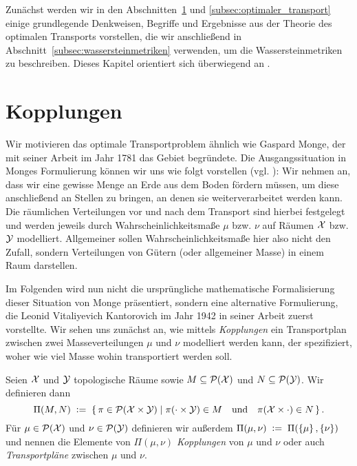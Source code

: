 \documentclass[../thesis/thesis.tex]{subfiles}
\begin{document}
	Zunächst werden wir in den Abschnitten~\ref{subsec:kopplungen} und \ref{subsec:optimaler_transport} einige grundlegende Denkweisen, Begriffe und Ergebnisse aus der Theorie des optimalen Transports vorstellen,
	die wir anschließend in Abschnitt~\ref{subsec:wassersteinmetriken} verwenden, um die Wassersteinmetriken zu beschreiben. Dieses Kapitel orientiert sich überwiegend an \cite[Chapter 4--6]{Villani.2009}.
	
	\section{Kopplungen}
	\label{subsec:kopplungen}
	
	Wir motivieren das optimale Transportproblem ähnlich wie Gaspard Monge, der mit seiner Arbeit \cite{Monge.1781} im Jahr 1781 das Gebiet begründete.  
	Die Ausgangssituation in Monges Formulierung können wir uns wie folgt vorstellen (vgl. \cite[S. 29--30]{Villani.2009}):
	Wir nehmen an, dass wir eine gewisse Menge an Erde aus dem Boden fördern müssen, um diese anschließend an Stellen zu bringen, an denen sie weiterverarbeitet werden kann. Die räumlichen Verteilungen vor und
	nach dem Transport sind hierbei festgelegt und werden jeweils durch Wahrscheinlichkeitsmaße $\mu$ bzw. $\nu$ auf Räumen $\mathcal{X}$ bzw. $\mathcal{Y}$ modelliert. 
	Allgemeiner sollen Wahrscheinlichkeitsmaße hier also nicht den Zufall, sondern Verteilungen von Gütern (oder allgemeiner Masse) in einem Raum darstellen.
	
	
	
	Im Folgenden wird nun nicht die ursprüngliche mathematische Formalisierung dieser Situation von Monge präsentiert, sondern eine alternative Formulierung, die Leonid Vitaliyevich Kantorovich im Jahr 1942 in seiner Arbeit \cite{Kantorovich.2006} zuerst vorstellte.
	Wir sehen uns zunächst an, wie mittels \emph{Kopplungen} ein Transportplan zwischen zwei Masseverteilungen $\mu$ und $\nu$ modelliert werden kann, der spezifiziert, woher wie viel Masse wohin transportiert werden soll.
	
	\begin{Definition}[Kopplung]
		Seien $\mathcal{X}$ und $\mathcal{Y}$ topologische Räume sowie $M \subseteq \mathcal{P}(\mathcal{X})$ und $N \subseteq \mathcal{P}(\mathcal{Y})$. Wir definieren dann
		\[ \Pi(M, N) \; \vcentcolon = \; \left\{\, \pi \in \mathcal{P}(\mathcal{X} \times \mathcal{Y}) \; \middle| \; \pi(\cdot \times \mathcal{Y}) \in M \quad \text{und} \quad \pi(\mathcal{X} \times \cdot) \in N \,\right\} \text{.}\]
		Für $\mu \in \mathcal{P}(\mathcal{X})$ und $\nu \in \mathcal{P}(\mathcal{Y})$ definieren wir außerdem $\Pi(\mu, \nu) \; \vcentcolon = \; \Pi(\left\{\mu\right\}, \left\{\nu\right\})$ und nennen die
		Elemente von $\Pi(\mu, \nu)$ \emph{Kopplungen} von $\mu$ und $\nu$ oder auch \emph{Transportpläne} zwischen $\mu$ und $\nu$.
	\end{Definition}
\end{document}
